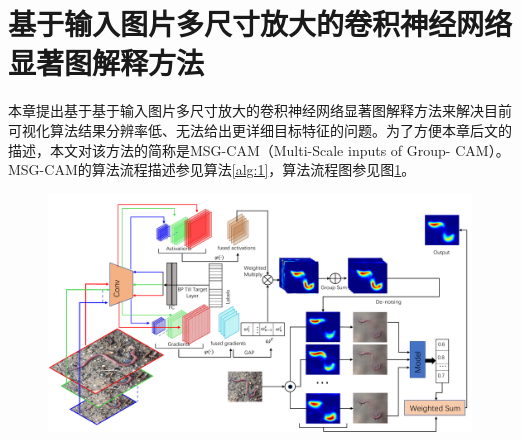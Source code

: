 \section{基于输入图片多尺寸放大的卷积神经网络显著图解释方法}
本章提出基于基于输入图片多尺寸放大的卷积神经网络显著图解释方法来解决目前可视化算法结果分辨率低、无法给出更详细目标特征的问题。为了方便本章后文的描述，本文对该方法的简称是MSG-CAM（Multi-Scale inputs of Group-
CAM）。MSG-CAM的算法流程描述参见算法\ref{alg:1}，算法流程图参见图\ref{fig:msg_pipeline}。

\begin{figure}[h]
	\centering 
	\includegraphics[width=15cm]{fig/ch3/msg_pipeline.pdf}
	\label{fig:msg_pipeline}
\end{figure}

